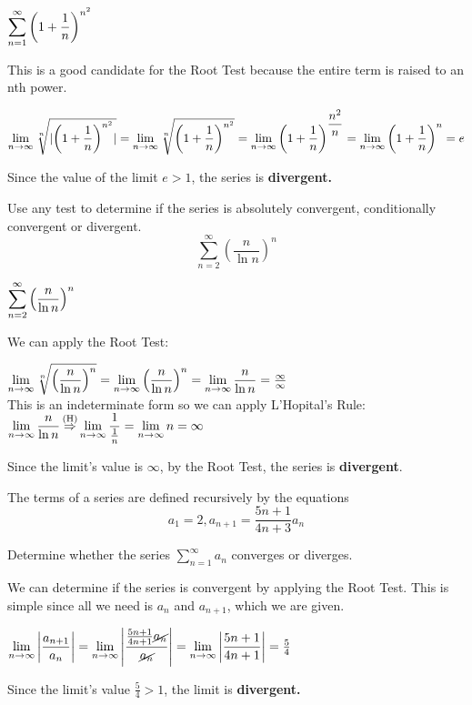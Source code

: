 \documentclass[12pt]{article}
\newcommand{\inftylim}[1]{\mathlarger{\lim_{n \to \infty}#1}}
\DeclarePairedDelimiter{\abs}{\lvert}{\rvert}
\newcommand{\Heq}{\overset{\hidewidth(\mathrm{H})\hidewidth}{\Rightarrow}}
\begin{document}
\begin{solution}
$\mathlarger{\sum^{\infty}_{n=1} \left(1 + \frac{1}{n}\right)^{n^2}}$

This is a good candidate for the Root Test because the entire term is raised to an nth power.

$\lim\limits_{n \to \infty} \sqrt[n]{\abs{ \left(1 + \dfrac{1}{n}\right)^{n^2}} } = \lim\limits_{n \to \infty} \sqrt[n]{ \left(1 + \dfrac{1}{n}\right)^{n^2}} = \lim\limits_{n \to \infty} \left(1 + \dfrac{1}{n}\right)^{\dfrac{n^2}{n}} = \lim\limits_{n \to \infty} \left(1 + \dfrac{1}{n}\right)^{n} = e$

Since the value of the limit $e > 1$, the series is \textbf{divergent.}
\end{solution}
Use any test to determine if the series is absolutely convergent, conditionally convergent or divergent.
$$\sum^{\infty}_{n=2} \left(\frac{n}{\ln n}\right)^{n}$$
\begin{solution}
$\mathlarger{\sum^{\infty}_{n=2} \left(\frac{n}{\ln n}\right)^{n}}$

We can apply the Root Test:

$\inftylim{ \sqrt[n]{\left(\frac{n}{\ln n}\right)^{n}}} = \inftylim{ \left(\frac{n}{\ln n}\right)^{n}} = \inftylim{\frac{n}{\ln n}} = \frac{\infty}{\infty}$ ~\\

This is an indeterminate form so we can apply L'Hopital's Rule: ~\\

$\inftylim{ \frac{n}{\ln n}} \Heq \inftylim{\frac{1}{\frac{1}{n}}} = \inftylim{n} = \infty$

Since the limit's value is $\infty$, by the Root Test, the series is \textbf{divergent}.

\end{solution}
\pagebreak
The terms of a series are defined recursively by the equations $$a_1 = 2, a_{n+1} = \frac{5n + 1}{4n + 3} a_n$$

Determine whether the series $\sum^{\infty}_{n=1} a_n$ converges or diverges.

\begin{solution}
We can determine if the series is convergent by applying the Root Test. This is simple since all we need is $a_n$ and $a_{n + 1}$, which we are given.

$\inftylim{ \left| \frac{a_{n+1}}{a_n}  \right|} = \inftylim{\left| \frac{\frac{5n + 1}{4n + 1}\cancel{a_n}}{\cancel{a_n}} \right|} = \inftylim{\left|\frac{5n + 1}{4n + 1}\right|} = \frac{5}{4}$


Since the limit's value $\frac{5}{4} > 1$, the limit is \textbf{divergent.}
\end{solution}
\end{document}
